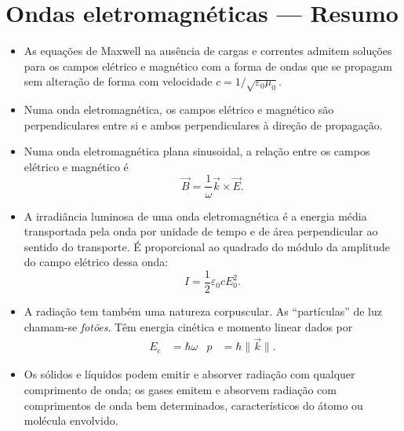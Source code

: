 \section*{Ondas eletromagnéticas --- Resumo}
\begin{itemize}
\item
    As equações de Maxwell na ausência de cargas e correntes admitem soluções
    para os campos elétrico e magnético com a forma de ondas que se propagam sem
    alteração de forma com velocidade $c=1/\sqrt{\varepsilon_0\mu_0}$.
\item
    Numa onda eletromagnética, os campos elétrico e magnético são
    perpendiculares entre si e ambos perpendiculares à direção de propagação.
\item
    Numa onda eletromagnética plana sinusoidal, a relação entre os campos
    elétrico e magnético é
    \begin{equation*}
    \vec B=\frac{1}{\omega}\vec k\times\vec E.
    \end{equation*}
\item
    A irradiância luminosa de uma onda eletromagnética é a energia média
    transportada pela onda por unidade de tempo e de área perpendicular ao
    sentido do transporte. É proporcional ao quadrado do módulo da amplitude do
    campo elétrico dessa onda:
    \begin{equation*}
    I=\frac{1}{2}\varepsilon_0cE_0^2.
    \end{equation*}
\item
    A radiação tem também uma natureza corpuscular. As ``partículas'' de luz
    chamam-se \emph{fotões}. Têm energia cinética e momento linear dados por
    \begin{align*}
    E_\text{c}&=\hbar\omega&p&=\hbar\|\vec k\|.
    \end{align*}
\item
    Os sólidos e líquidos podem emitir e absorver radiação com qualquer
    comprimento de onda; os gases emitem e absorvem radiação com comprimentos de
    onda bem determinados, característicos do átomo ou molécula envolvido.
\end{itemize}
